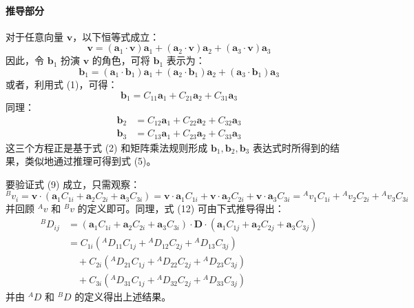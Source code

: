 \paragraph{推导部分}
对于任意向量 \(\mathbf{v}\)，以下恒等式成立：
\begin{equation}
\mathbf{v} = (\mathbf{a}_1 \cdot \mathbf{v})\mathbf{a}_1 + (\mathbf{a}_2 \cdot \mathbf{v})\mathbf{a}_2 + (\mathbf{a}_3 \cdot \mathbf{v})\mathbf{a}_3 \tag{40}
\end{equation}
因此，令 \(\mathbf{b}_1\) 扮演 \(\mathbf{v}\) 的角色，可将 \(\mathbf{b}_1\) 表示为：
\begin{equation}
\mathbf{b}_1 = (\mathbf{a}_1 \cdot \mathbf{b}_1)\mathbf{a}_1 + (\mathbf{a}_2 \cdot \mathbf{b}_1)\mathbf{a}_2 + (\mathbf{a}_3 \cdot \mathbf{b}_1)\mathbf{a}_3 \tag{41}
\end{equation}
或者，利用式 (1)，可得：
\begin{equation}
\mathbf{b}_1 = C_{11}\mathbf{a}_1 + C_{21}\mathbf{a}_2 + C_{31}\mathbf{a}_3 \tag{42}
\end{equation}
同理：
\begin{align}
\mathbf{b}_2 &= C_{12}\mathbf{a}_1 + C_{22}\mathbf{a}_2 + C_{32}\mathbf{a}_3 \tag{43} \\
\mathbf{b}_3 &= C_{13}\mathbf{a}_1 + C_{23}\mathbf{a}_2 + C_{33}\mathbf{a}_3 \tag{44}
\end{align}
这三个方程正是基于式 (2) 和矩阵乘法规则形成 \(\mathbf{b}_1, \mathbf{b}_2, \mathbf{b}_3\) 表达式时所得到的结果，类似地通过推理可得到式 (5)。

要验证式 (9) 成立，只需观察：
\begin{equation}
{}^B v_i = \mathbf{v} \cdot (\mathbf{a}_1 C_{1i} + \mathbf{a}_2 C_{2i} + \mathbf{a}_3 C_{3i}) = \mathbf{v} \cdot \mathbf{a}_1 C_{1i} + \mathbf{v} \cdot \mathbf{a}_2 C_{2i} + \mathbf{v} \cdot \mathbf{a}_3 C_{3i} = {}^A v_1 C_{1i} + {}^A v_2 C_{2i} + {}^A v_3 C_{3i} \tag{45}
\end{equation}
并回顾 \({}^A v\) 和 \({}^B v\) 的定义即可。同理，式 (12) 可由下式推导得出：
\begin{align}
{}^B D_{ij} &= (\mathbf{a}_1 C_{1i} + \mathbf{a}_2 C_{2i} + \mathbf{a}_3 C_{3i}) \cdot \mathbf{D} \cdot (\mathbf{a}_1 C_{1j} + \mathbf{a}_2 C_{2j} + \mathbf{a}_3 C_{3j}) \nonumber \\
&= C_{1i} ({}^A D_{11} C_{1j} + {}^A D_{12} C_{2j} + {}^A D_{13} C_{3j}) \nonumber \\
&\quad + C_{2i} ({}^A D_{21} C_{1j} + {}^A D_{22} C_{2j} + {}^A D_{23} C_{3j}) \nonumber \\
&\quad + C_{3i} ({}^A D_{31} C_{1j} + {}^A D_{32} C_{2j} + {}^A D_{33} C_{3j}) \tag{46}
\end{align}
并由 \({}^A D\) 和 \({}^B D\) 的定义得出上述结果。

